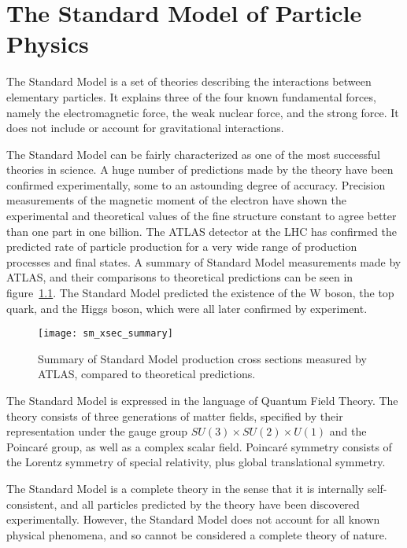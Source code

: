 \chapter{The Standard Model of Particle Physics}\label{ch:sm}

The Standard Model is a set of theories describing the interactions between elementary particles.
It explains three of the four known fundamental forces, namely the electromagnetic force,
the weak nuclear force, and the strong force.
It does not include  or account for gravitational interactions.

The Standard Model can be fairly characterized as one of the most successful theories in science.
A huge number of predictions made by the theory have been confirmed experimentally,
some to an astounding degree of accuracy.
Precision measurements of the magnetic moment of the electron have shown the experimental and theoretical values of the
fine structure constant to agree better than one part in one billion.\cite{sm-fine-structure-2008}
The ATLAS detector at the LHC has confirmed the predicted rate of particle production for a very wide range of
production processes and final states.
A summary of Standard Model measurements made by ATLAS, and their comparisons to theoretical predictions can be seen in figure~\ref{fig:sm_xsec_summary}.
The Standard Model predicted the existence of the W boson, the top quark, and the Higgs boson,
which were all later confirmed by experiment.

\begin{figure}[h!]
    \centering
\texttt{[image: sm\_xsec\_summary]}
\caption{Summary of Standard Model production cross sections measured by ATLAS, compared to theoretical predictions.}
\label{fig:sm_xsec_summary}
\end{figure}

The Standard Model is expressed in the language of Quantum Field Theory.
The theory consists of three generations of matter fields,
specified by their representation under the gauge group $SU(3)\times SU(2)\times U(1)$ and the Poincar\'e group,
as well as a complex scalar field.
Poincar\'e symmetry consists of the Lorentz symmetry of special relativity, plus global translational symmetry.

The Standard Model is a complete theory in the sense that it is internally self-consistent,
and all particles predicted by the theory have been discovered experimentally.
However, the Standard Model does not account for all known physical phenomena,
and so cannot be considered a complete theory of nature.

